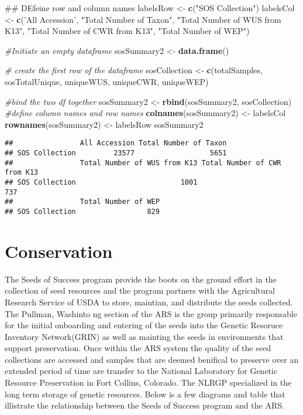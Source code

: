 \documentclass[]{article}
\newenvironment{Shaded}{\begin{snugshade}}{\end{snugshade}}
\newcommand{\KeywordTok}[1]{\textcolor[rgb]{0.13,0.29,0.53}{\textbf{{#1}}}}
\newcommand{\StringTok}[1]{\textcolor[rgb]{0.31,0.60,0.02}{{#1}}}
\newcommand{\CommentTok}[1]{\textcolor[rgb]{0.56,0.35,0.01}{\textit{{#1}}}}
\newcommand{\NormalTok}[1]{{#1}}
\begin{document}
\begin{Shaded}
\begin{Highlighting}[]
\NormalTok{## DEfeine row and column names }
\NormalTok{labelsRow <-}\StringTok{ }\KeywordTok{c}\NormalTok{(}\StringTok{"SOS Collection"}\NormalTok{)}
\NormalTok{labelsCol <-}\StringTok{ }\KeywordTok{c}\NormalTok{(}\StringTok{'All Accession'}\NormalTok{, }\StringTok{"Total Number of Taxon"}\NormalTok{, }\StringTok{"Total Number of WUS from K13"}\NormalTok{, }\StringTok{"Total Number of CWR from K13"}\NormalTok{, }\StringTok{"Total Number of WEP"}\NormalTok{)}

\CommentTok{#Initiate an empty dataframe }
\NormalTok{sosSummary2 <-}\StringTok{ }\KeywordTok{data.frame}\NormalTok{()}

\CommentTok{# create the first row of the dataframe }
\NormalTok{sosCollection <-}\StringTok{ }\KeywordTok{c}\NormalTok{(totalSamples, sosTotalUnique, uniqueWUS, uniqueCWR, uniqueWEP)}

\CommentTok{#bind the two df together }
\NormalTok{sosSummary2 <-}\StringTok{ }\KeywordTok{rbind}\NormalTok{(sosSummary2, sosCollection)}
\CommentTok{#define column names and row names }
\KeywordTok{colnames}\NormalTok{(sosSummary2) <-}\StringTok{ }\NormalTok{labelsCol}
\KeywordTok{rownames}\NormalTok{(sosSummary2) <-}\StringTok{ }\NormalTok{labelsRow}
\NormalTok{sosSummary2}
\end{Highlighting}
\end{Shaded}

\begin{verbatim}
##                All Accession Total Number of Taxon
## SOS Collection         23577                  5651
##                Total Number of WUS from K13 Total Number of CWR from K13
## SOS Collection                         1001                          737
##                Total Number of WEP
## SOS Collection                 829
\end{verbatim}

\section{Conservation}\label{conservation}

The Seeds of Success program provide the boots on the ground effort in
the collection of seed resources and the program partners with the
Agricultural Research Service of USDA to store, maintian, and distribute
the seeds collected. The Pullman, Washinto ng section of the ARS is the
group primarily responsable for the initial onboarding and entering of
the seeds into the Genetic Resoruce Inventory Network(GRIN) as well as
mainting the seeds in environments that support preservation. Once
within the ARS system the quality of the seed collections are accessed
and samples that are deemed benifical to preserve over an extended
period of time are transfer to the National Laboratory for Genetic
Resource Preservation in Fort Collins, Colorado. The NLRGP specialized
in the long term storage of genetic resources. Below is a few diagrams
and table that illistrate the relationship between the Seeds of Success
program and the ARS.
\end{document}
